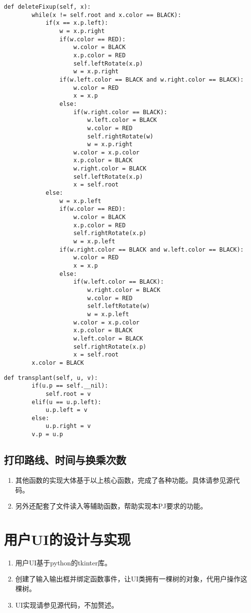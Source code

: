 \documentclass[12pt,letterpaper]{article}
\begin{document}
\begin{lstlisting}[style = Python]
    def deleteFixup(self, x):
        while(x != self.root and x.color == BLACK):
            if(x == x.p.left):
                w = x.p.right
                if(w.color == RED):
                    w.color = BLACK
                    x.p.color = RED
                    self.leftRotate(x.p)
                    w = x.p.right
                if(w.left.color == BLACK and w.right.color == BLACK):
                    w.color = RED
                    x = x.p
                else:
                    if(w.right.color == BLACK):
                        w.left.color = BLACK
                        w.color = RED
                        self.rightRotate(w)
                        w = x.p.right
                    w.color = x.p.color
                    x.p.color = BLACK
                    w.right.color = BLACK
                    self.leftRotate(x.p)
                    x = self.root
            else:
                w = x.p.left
                if(w.color == RED):
                    w.color = BLACK
                    x.p.color = RED
                    self.rightRotate(x.p)
                    w = x.p.left
                if(w.right.color == BLACK and w.left.color == BLACK):
                    w.color = RED
                    x = x.p
                else:
                    if(w.left.color == BLACK):
                        w.right.color = BLACK
                        w.color = RED
                        self.leftRotate(w)
                        w = x.p.left
                    w.color = x.p.color
                    x.p.color = BLACK
                    w.left.color = BLACK
                    self.rightRotate(x.p)
                    x = self.root
        x.color = BLACK
\end{lstlisting}
\begin{lstlisting}[style = Python]
    def transplant(self, u, v):
        if(u.p == self.__nil):
            self.root = v
        elif(u == u.p.left):
            u.p.left = v
        else:
            u.p.right = v
        v.p = u.p  
\end{lstlisting}


\subsection{打印路线、时间与换乘次数}
\begin{enumerate}
	\item 其他函数的实现大体基于以上核心函数，完成了各种功能。具体请参见源代码。
	\item 另外还配套了文件读入等辅助函数，帮助实现本PJ要求的功能。
\end{enumerate}


\section{用户UI的设计与实现}
\begin{enumerate}
	\item 用户UI基于python的tkinter库。
	\item 创建了输入输出框并绑定函数事件，让UI类拥有一棵树的对象，代用户操作这棵树。
	\item UI实现请参见源代码，不加赘述。
\end{enumerate}	
\end{document}
